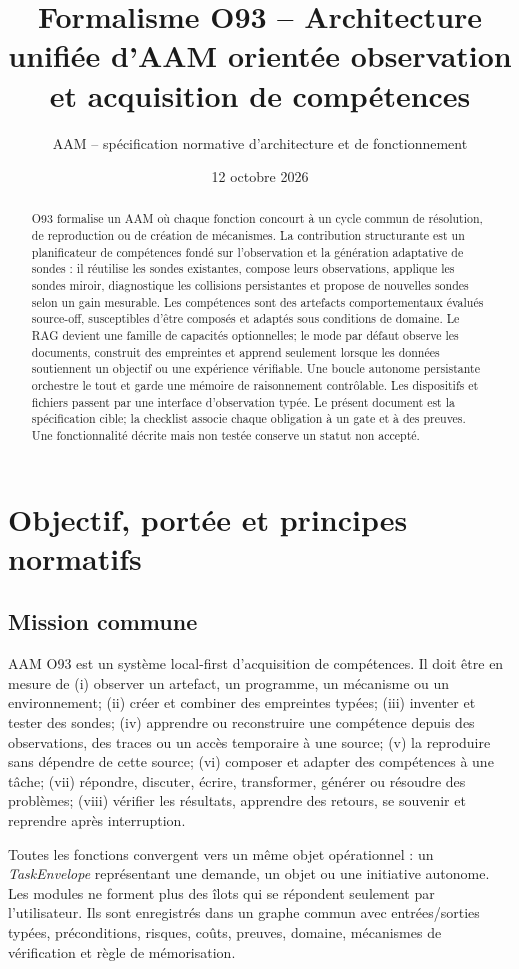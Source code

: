 \documentclass[11pt,a4paper,oneside]{report}
\title{Formalisme O93 -- Architecture unifiée d'AAM orientée observation et acquisition de compétences}
\author{AAM -- spécification normative d'architecture et de fonctionnement}
\date{12 octobre 2026}
\begin{document}
\maketitle
\begin{abstract}
O93 formalise un AAM où chaque fonction concourt à un cycle commun de résolution, de reproduction ou de création de mécanismes. La contribution structurante est un planificateur de compétences fondé sur l'observation et la génération adaptative de sondes : il réutilise les sondes existantes, compose leurs observations, applique les sondes miroir, diagnostique les collisions persistantes et propose de nouvelles sondes selon un gain mesurable. Les compétences sont des artefacts comportementaux évalués source-off, susceptibles d'être composés et adaptés sous conditions de domaine. Le RAG devient une famille de capacités optionnelles; le mode par défaut observe les documents, construit des empreintes et apprend seulement lorsque les données soutiennent un objectif ou une expérience vérifiable. Une boucle autonome persistante orchestre le tout et garde une mémoire de raisonnement contrôlable. Les dispositifs et fichiers passent par une interface d'observation typée. Le présent document est la spécification cible; la checklist associe chaque obligation à un gate et à des preuves. Une fonctionnalité décrite mais non testée conserve un statut non accepté.
\end{abstract}
\tableofcontents
\chapter{Objectif, portée et principes normatifs}
\section{Mission commune}
AAM O93 est un système local-first d'acquisition de compétences. Il doit être en mesure de (i) observer un artefact, un programme, un mécanisme ou un environnement; (ii) créer et combiner des empreintes typées; (iii) inventer et tester des sondes; (iv) apprendre ou reconstruire une compétence depuis des observations, des traces ou un accès temporaire à une source; (v) la reproduire sans dépendre de cette source; (vi) composer et adapter des compétences à une tâche; (vii) répondre, discuter, écrire, transformer, générer ou résoudre des problèmes; (viii) vérifier les résultats, apprendre des retours, se souvenir et reprendre après interruption.

Toutes les fonctions convergent vers un même objet opérationnel : un \emph{TaskEnvelope} représentant une demande, un objet ou une initiative autonome. Les modules ne forment plus des îlots qui se répondent seulement par l'utilisateur. Ils sont enregistrés dans un graphe commun avec entrées/sorties typées, préconditions, risques, coûts, preuves, domaine, mécanismes de vérification et règle de mémorisation.
\end{document}

